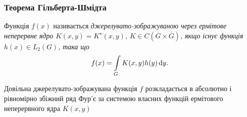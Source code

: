 \subsubsection{Теорема Гільберта-Шмідта}

\begin{definition}
	Функція $f(x)$ називається \it{джерелувато-зображуваною} через ермітове неперервне ядро $K(x, y) = K^\star (x, y)$, $K \in  C\left(\overline G \times \overline G\right)$, якщо існує функція $h(x) \in L_2(G)$, така що 
	\begin{equation}
		f(x) = \displaystyle\int\limits_G K(x, y) h(y) \mathop{}\!\mathrm{d} y.
	\end{equation}
\end{definition}

\begin{theorem}
	Довільна джерелувато-зображувана функція $f$ розкладається в абсолютно і рівномірно збіжний ряд Фур'є за системою власних функцій ермітового неперервного ядра $K(x, y)$
\end{theorem}

